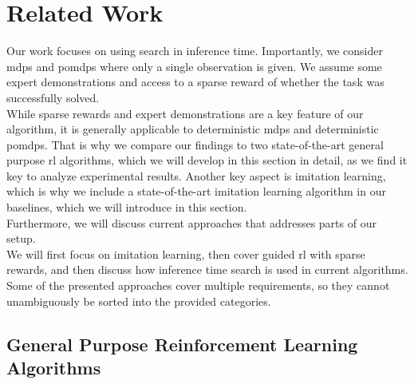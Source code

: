 
\chapter{Related Work}
\label{chapter:RelWork}
Our work focuses on using search in inference time. Importantly, we consider \ac{mdp}s and \ac{pomdp}s where only a single observation is given. 
We assume some expert demonstrations and access to a sparse
reward of whether the task was successfully solved. \\

While sparse rewards and expert demonstrations are a key feature of our algorithm, it is generally applicable to deterministic \ac{mdp}s and deterministic \ac{pomdp}s. That is why we compare our 
findings to two state-of-the-art general purpose \ac{rl} algorithms, which we will develop in this section in detail, as we find it key to analyze experimental results. 
Another key aspect is imitation learning, which is why we include a state-of-the-art imitation learning algorithm in our baselines, which we will introduce in this section. \\

Furthermore, we will discuss current approaches that addresses parts of our setup. \\
We will first focus on imitation learning, then cover guided \ac{rl} with sparse rewards, and then
discuss how inference time search is used in current algorithms. Some of the presented approaches cover multiple requirements, so they cannot unambiguously be sorted into the provided categories.

\section{General Purpose Reinforcement Learning Algorithms}
